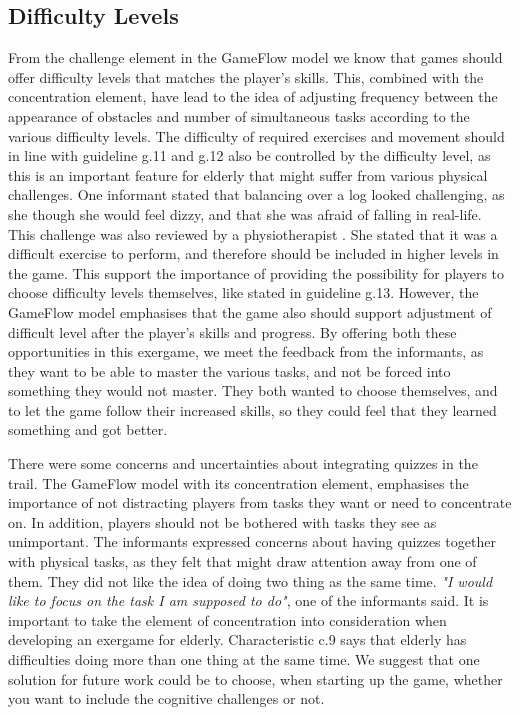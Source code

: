 \subsection{Difficulty Levels}

From the challenge element in the GameFlow model we know that games should offer difficulty levels that matches the player's skills. This, combined with the concentration element, have lead to the idea of adjusting frequency between the appearance of obstacles and number of simultaneous tasks according to the various difficulty levels. The difficulty of required exercises and movement should in line with guideline g.11 and g.12 also be controlled by the difficulty level, as this is an important feature for elderly that might suffer from various physical challenges. One informant stated that balancing over a log looked challenging, as she though she would feel dizzy, and that she was afraid of falling in real-life. This challenge was also reviewed by a physiotherapist . She stated that it was a difficult exercise to perform, and therefore should be included in higher levels in the game. This support the importance of providing the possibility for players to choose difficulty levels themselves, like stated in guideline g.13. However, the GameFlow model emphasises that the game also should support adjustment of difficult level after the player's skills and progress. By offering both these opportunities in this exergame, we meet the feedback from the informants, as they want to be able to master the various tasks, and not be forced into something they would not master. They both wanted to choose themselves, and to let the game follow their increased skills, so they could feel that they learned something and got better. 

There were some concerns and uncertainties about integrating quizzes in the trail. The GameFlow model with its concentration element, emphasises the importance of not distracting players from tasks they want or need to concentrate on. In addition, players should not be bothered with tasks they see as unimportant. The informants expressed concerns about having quizzes together with physical tasks, as they felt that might draw attention away from one of them. They did not like the idea of doing two thing as the same time. \emph{"I would like to focus on the task I am supposed to do"}, one of the informants said. It is important to take the element of concentration into consideration when developing an exergame for elderly. Characteristic c.9 says that elderly has difficulties doing more than one thing at the same time. We suggest that one solution for future work could be to choose, when starting up the game, whether you want to include the cognitive challenges or not. 

